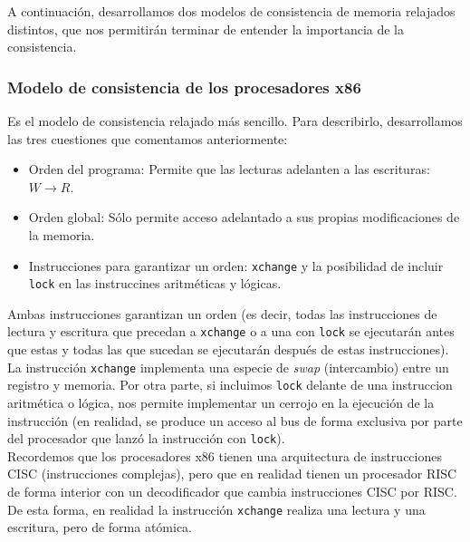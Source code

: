 A continuación, desarrollamos dos modelos de consistencia de memoria relajados distintos, que nos permitirán terminar de entender la importancia de la consistencia.

\subsubsection{Modelo de consistencia de los procesadores x86}
Es el modelo de consistencia relajado más sencillo. Para describirlo, desarrollamos las tres cuestiones que comentamos anteriormente:
\begin{itemize}
    \item Orden del programa: Permite que las lecturas adelanten a las escrituras: ${W\rightarrow R}$.
    \item Orden global: Sólo permite acceso adelantado a sus propias modificaciones de la memoria.
    \item Instrucciones para garantizar un orden: \verb|xchange| y la posibilidad de incluir \verb|lock| en las instruccines aritméticas y lógicas.
\end{itemize}
Ambas instrucciones garantizan un orden (es decir, todas las instrucciones de lectura y escritura que precedan a \verb|xchange| o a una con \verb|lock| se ejecutarán antes que estas y todas las que sucedan se ejecutarán después de estas instrucciones). La instrucción \verb|xchange| implementa una especie de \emph{swap} (intercambio) entre un registro y memoria. Por otra parte, si incluimos \verb|lock| delante de una instruccion aritmética o lógica, nos permite implementar un cerrojo en la ejecución de la instrucción (en realidad, se produce un acceso al bus de forma exclusiva por parte del procesador que lanzó la instrucción con \verb|lock|).\\

Recordemos que los procesadores x86 tienen una arquitectura de instrucciones CISC (instrucciones complejas), pero que en realidad tienen un procesador RISC de forma interior con un decodificador que cambia instrucciones CISC por RISC\@. De esta forma, en realidad la instrucción \verb|xchange| realiza una lectura y una escritura, pero de forma atómica.

